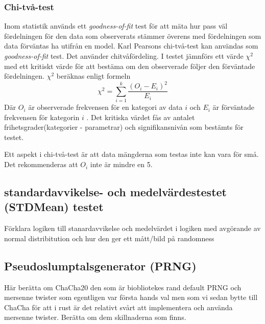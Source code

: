 \documentclass[swedish,a4paper]{article}
\begin{document}
\subsubsection{Chi-två-test}
\label{sec:chi_square}
Inom statistik används ett \textit{goodness-of-fit} test för att mäta
hur pass väl fördelningen för den data som observerats stämmer överens
med fördelningen som data förväntas ha utifrån en model. Karl Pearsons
chi-två-test kan användas som \textit{goodness-of-fit} test. Det
använder chitvåfördeling. I testet jämnförs ett värde $\chi^2$ med ett
kritiskt värde för att bestäma om den observerade följer den förväntade
fördelningen. $\chi^2$ beräknas enligt formeln
$$\chi^2 = \sum_{i=1}^k\frac{(O_i - E_i)^2}{E_i}$$
Där $O_i$ är observerade frekvensen för en kategori av data $i$ och $E_i$
är förväntade frekvensen för kategorin $i$ \parencite{nist}.
Det kritiska värdet fås av antalet frihetsgrader(kategorier - parametrar)
och signifikansnivån som bestämts för testet.

Ett aspekt i chi-två-test är att data mängderna som testas inte kan vara för små. Det rekommenderas att $O_i$ inte är mindre en 5.

\subsection{standardavvikelse- och medelvärdestestet (STDMean) testet}
\label{sec:stdmean}

Förklara logiken till stanardavvikelse och medelvärdet
i logiken med avgörande av normal distribitution och hur den ger ett mått/bild på randomness

\subsection{Pseudoslumptalsgenerator (PRNG)}
\label{sec:prng}
Här berätta om ChaCha20 \parencite{chacha} den som är biobliotekes rand
\parencite{rand_crate} default PRNG och mersenne twister som egentligen var första
hands val
\parencite{mersenne_twister} men som vi sedan bytte till ChaCha för att i rust
är det relativt svårt att  implementera och använda mersenne twister. Berätta om
dem skillnaderna som finns.
\end{document}
